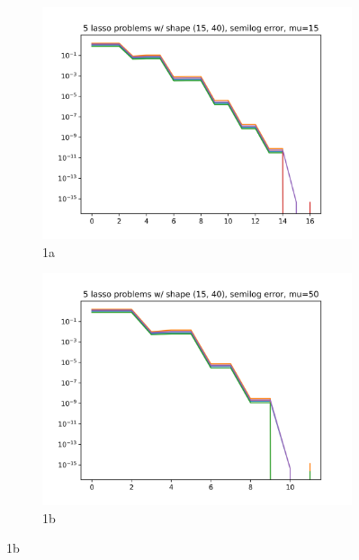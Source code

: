 \documentclass{article}
\begin{document}
{\begin{figure}
\begin{subfigure}{.5\textwidth}
  \centering
  \includegraphics[width=.8\linewidth]{lasso_qp_15.png}
  \caption{1a}
  \label{fig:sfig1}
\end{subfigure}%
\begin{subfigure}{.5\textwidth}
  \centering
  \includegraphics[width=.8\linewidth]{lasso_qp_50.png}
  \caption{1b}
  \label{fig:sfig2}
\end{subfigure}


\end{figure}}
\end{document}
